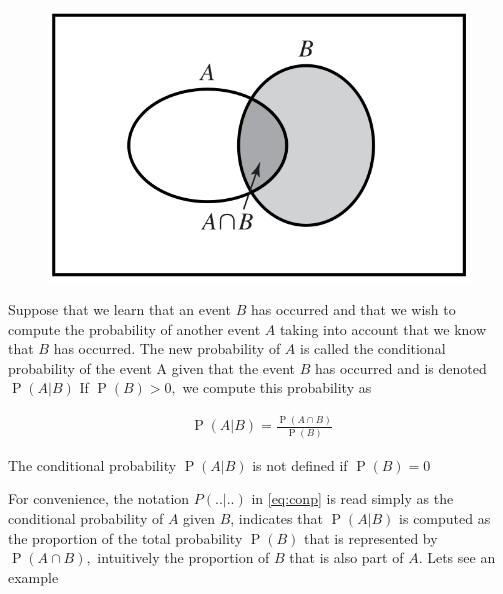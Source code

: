 \documentclass[ 11pt,%
				a4paper,%
				oneside,%
				headinclude,%
				footinclude = true,%
				cleardoublepage = empty,%
				reqno]{scrbook}
\begin{document}
\begin{figure}[H]
\begin{center}
	\includegraphics[scale = .4]{images/condProb.png}
\end{center}
	
\end{figure}

\begin{definition}
Suppose that we learn that an event $B$ has occurred and that we wish to compute the probability of another event $A$ taking into account that we know that $B$ has occurred. The new probability of $A$ is called the conditional probability of the event A given that the event $B$ has occurred and is denoted $\operatorname{P}(A | B)$
If $\operatorname{P}(B)>0,$ we compute this probability as

\begin{align}~\label{eq:conp}
	\operatorname{P}(A | B)=\frac{\operatorname{P}(A \cap B)}{\operatorname{P}(B)}
\end{align}


The conditional probability $\operatorname{P}(A | B)$ is not defined if $\operatorname{P}(B)=0$
\end{definition}

For convenience, the notation $P(..| ..)$ in \cref{eq:conp} is read simply as the conditional probability of $A$ given $B$, indicates that $\operatorname{P}(A | B)$ is computed as the proportion of the total probability $\operatorname{P}(B)$ that is represented by $\operatorname{P}(A \cap B),$ intuitively the proportion of $B$ that is also part of $A$. Lets see an example
\end{document}
